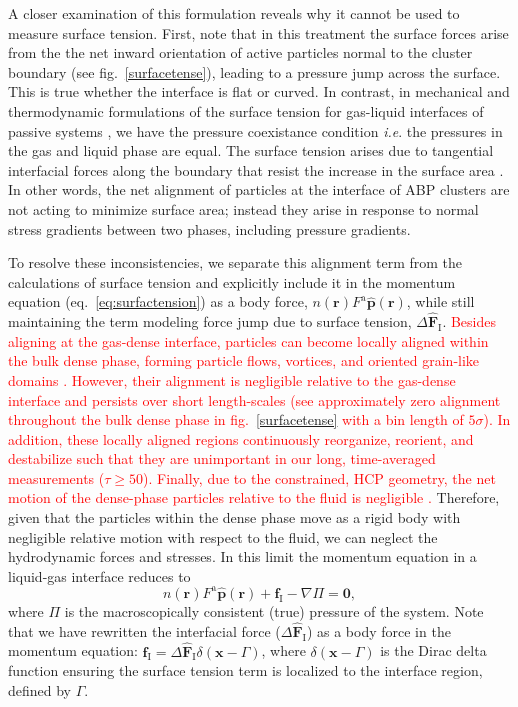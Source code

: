 \documentclass[twoside,twocolumn,9pt]{article}
\begin{document}
 A closer examination of this formulation reveals why it cannot be used to measure surface tension. First, note that in this treatment the surface forces arise from the the net inward orientation of active particles normal to the cluster boundary (see fig.~\ref{surfacetense}), leading to a pressure jump across the surface. This is true whether the interface is flat or curved.  In contrast, in mechanical and thermodynamic formulations of the surface tension for gas-liquid interfaces of passive systems  \cite{Navascues1979}, we have the pressure coexistance condition \textit{i.e}. the pressures in the gas and liquid phase are equal. The surface tension arises due to tangential interfacial forces along the boundary that resist the increase in the surface area \cite{Kirkwood1949}. In other words, the net alignment of particles at the interface of ABP clusters are not acting to minimize surface area; instead they arise in response to normal stress gradients between two phases, including pressure gradients. 
 
To resolve these inconsistencies, we separate this alignment term from the calculations of surface tension and explicitly include it in the momentum equation (eq.~\ref{eq:surfactension}) as a body force, $n(\mathbf{r}) F^\text{a} \hat{\mathbf{p}}(\mathbf{r})$, while still maintaining the term modeling force jump due to surface tension, $\Delta \hat{\mathbf{F}}_\text{I}$. \textcolor{red}{Besides aligning at the gas-dense interface, particles can become locally aligned within the bulk dense phase, forming particle flows, vortices, and oriented grain-like domains \cite{Caprini2020, Caprini2020a, Caprini2021}. However, their alignment is negligible relative to the gas-dense interface and persists over short length-scales (see approximately zero alignment throughout the bulk dense phase in fig.~\ref{surfacetense} with a bin length of $5\sigma$). In addition, these locally aligned regions continuously reorganize, reorient, and destabilize \cite{Caprini2020a} such that they are unimportant in our long, time-averaged measurements ($\tau\ge50$).  Finally, due to the constrained, HCP geometry, the net motion of the dense-phase particles relative to the fluid is negligible \cite{Caprini2020}.} Therefore, given that the particles within the dense phase move as a rigid body with negligible relative motion with respect to the fluid, we can neglect the hydrodynamic forces and stresses. In this limit 
the momentum equation in a liquid-gas interface reduces to 
\begin{equation}
    n(\mathbf{r}) F^\text{a} \hat{\mathbf{p}}(\mathbf{r})+\mathbf{f}_\text{I}-\nabla \Pi=\mathbf{0},
\end{equation}\label{momnew}
where $\Pi$ is the macroscopically consistent (true) pressure of the system. 
Note that we have rewritten the interfacial force ($\Delta \hat{\mathbf{F}}_\text{I}$) as a body force in the momentum equation: $\mathbf{f}_\text{I}=\Delta \mathbf{\hat{F}}_\text{I} \delta(\mathbf{x}-\Gamma)$, where $\delta(\mathbf{x}-\Gamma)$ is the Dirac delta function ensuring the surface tension term is localized to the interface region, defined by $\Gamma$. \footnotemark
\end{document}
